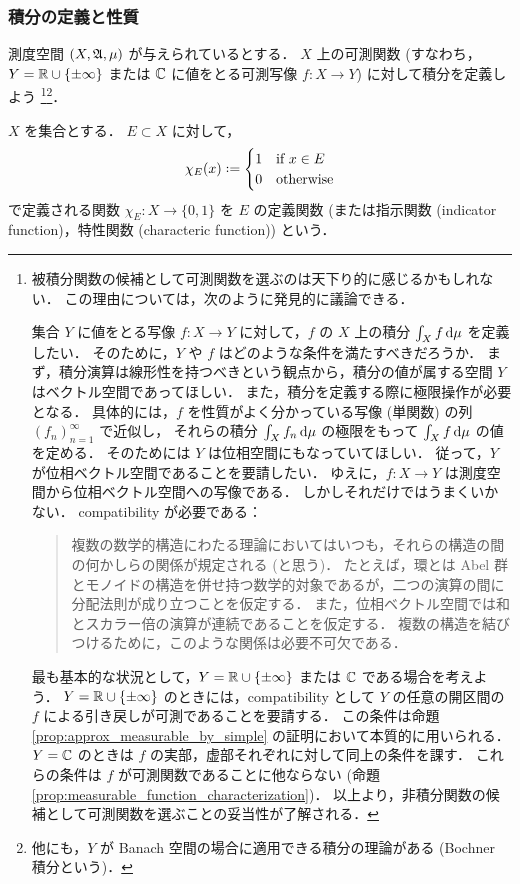 \subsubsection{積分の定義と性質}

測度空間 $(X,\mathfrak{A},\mu)$ が与えられているとする．
$X$ 上の可測関数 (すなわち，$Y=\mathbb{R}\cup\{\pm\infty\}$ または $\mathbb{C}$ に値をとる可測写像 $f:X\to Y$) に対して積分を定義しよう
\footnote{
    被積分関数の候補として可測関数を選ぶのは天下り的に感じるかもしれない．
    この理由については，次のように発見的に議論できる．

    集合 $Y$ に値をとる写像 $f:X\to Y$ に対して，$f$ の $X$ 上の積分 $\int_Xf\,\mathrm{d}\mu$ を定義したい．
    そのために，$Y$ や $f$ はどのような条件を満たすべきだろうか．
    まず，積分演算は線形性を持つべきという観点から，積分の値が属する空間 $Y$ はベクトル空間であってほしい．
    また，積分を定義する際に極限操作が必要となる．
    具体的には，$f$ を性質がよく分かっている写像 (単関数) の列 $(f_n)_{n=1}^\infty$ で近似し，
    それらの積分 $\int_X f_n\,\mathrm{d}\mu$ の極限をもって $\int_Xf\,\mathrm{d}\mu$ の値を定める．
    そのためには $Y$ は位相空間にもなっていてほしい．
    従って，$Y$ が位相ベクトル空間であることを要請したい．
    ゆえに，$f:X\to Y$ は測度空間から位相ベクトル空間への写像である．
    しかしそれだけではうまくいかない．
    compatibility が必要である：
    \begin{quote}
        複数の数学的構造にわたる理論においてはいつも，それらの構造の間の何かしらの関係が規定される (と思う)．
        たとえば，環とは Abel 群とモノイドの構造を併せ持つ数学的対象であるが，二つの演算の間に分配法則が成り立つことを仮定する．
        また，位相ベクトル空間では和とスカラー倍の演算が連続であることを仮定する．
        複数の構造を結びつけるために，このような関係は必要不可欠である．
    \end{quote}
    最も基本的な状況として，$Y=\mathbb{R}\cup\{\pm\infty\}$ または $\mathbb{C}$ である場合を考えよう．
    $Y=\mathbb{R}\cup\{\pm\infty\}$ のときには，compatibility として $Y$ の任意の開区間の $f$ による引き戻しが可測であることを要請する．
    この条件は命題 \ref{prop:approx_measurable_by_simple} の証明において本質的に用いられる．
    $Y=\mathbb{C}$ のときは $f$ の実部，虚部それぞれに対して同上の条件を課す．
    これらの条件は $f$ が可測関数であることに他ならない (命題 \ref{prop:measurable_function_characterization})．
    以上より，非積分関数の候補として可測関数を選ぶことの妥当性が了解される．
}\footnote{
    他にも，$Y$ が Banach 空間の場合に適用できる積分の理論がある (Bochner 積分という)．
}．

\begin{definition}
    $X$ を集合とする．
    $E\subset X$ に対して，
    \begin{align*}
        \chi_E(x)\defeq\begin{cases}
            1&\text{if $x\in E$}\\
            0&\text{otherwise}
        \end{cases}
    \end{align*}
    で定義される関数 $\chi_E:X\to\{0,1\}$ を $E$ の定義関数
    (または指示関数 (indicator function)，特性関数 (characteric function)) という．
\end{definition}

